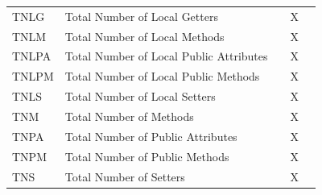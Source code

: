 \begin{table}[H]
{\begin{tabular}{lllll}
TNLG        & Total   Number of Local Getters               &        & X     &         \\
TNLM        & Total Number of   Local Methods               &        & X     &         \\
TNLPA       & Total   Number of Local Public Attributes     &        & X     &         \\
TNLPM       & Total Number of   Local Public Methods        &        & X     &         \\
TNLS        & Total   Number of Local Setters               &        & X     &         \\
TNM         & Total Number of Methods                       &        & X     &         \\
TNPA        & Total   Number of Public Attributes           &        & X     &         \\
TNPM        & Total Number of   Public Methods              &        & X     &         \\
TNS         & Total Number of Setters                       &        & X     &        \\
\bottomrule
\end{tabular}

\label{metrics-table}
}
\end{table}
